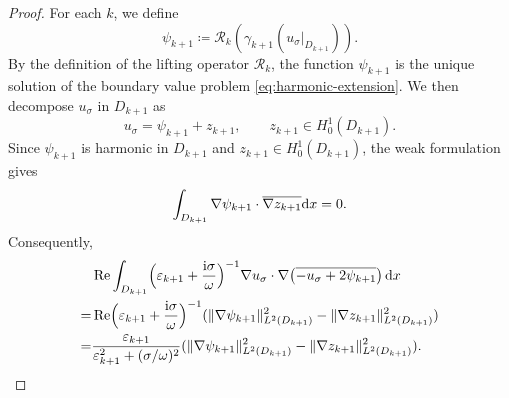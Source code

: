 \documentclass[12pt,reqno]{amsart}
\numberwithin{equation}{section}
\begin{document}
\begin{proof}
For each $k$, we define
\begin{equation*}
    \psi_{k+1} \coloneqq \mathcal{R}_k(\gamma_{k+1}(u_\sigma|_{D_{k+1}})).
\end{equation*}
By the definition of the lifting operator \(\mathcal{R}_k\), the function
\(\psi_{k+1}\) is the unique solution of the boundary value problem
\eqref{eq:harmonic-extension}. We then decompose \(u_\sigma\) in
\(D_{k+1}\) as
\[
    u_\sigma = \psi_{k+1}+z_{k+1},
    \qquad z_{k+1}\in H^1_0(D_{k+1}).
\]
Since \(\psi_{k+1}\) is harmonic in \(D_{k+1}\) and
\(z_{k+1}\in H^1_0(D_{k+1})\), the weak formulation gives
\begin{align*}
\int_{D_{k+1}}\nabla\psi_{k+1}\cdot\overline{\nabla z_{k+1}}{\rm d}x=0.
\end{align*}
Consequently,
\begin{equation}\label{eq66}
\begin{aligned}
&\operatorname{Re} \int_{D_{k+1}} \Bigl( \varepsilon_{k+1} + \frac{{\rm i}\sigma}{\omega} \Bigr)^{-1}
    \nabla u_\sigma \cdot \nabla \bigl( \overline{-u_\sigma+2\psi_{k+1}} \bigr) \, {\rm d}x\\
=&\operatorname{Re}\Bigl( \varepsilon_{k+1} + \frac{{\rm i}\sigma}{\omega} \Bigr)^{-1}(\|\nabla\psi_{k+1}\|_{L^2(D_{k+1})}^2-\|\nabla z_{k+1}\|_{L^2(D_{k+1})}^2)\\
=&\dfrac{\varepsilon_{k+1}}{\varepsilon_{k+1}^2+(\sigma/\omega)^2}(\|\nabla\psi_{k+1}\|_{L^2(D_{k+1})}^2-\|\nabla z_{k+1}\|_{L^2(D_{k+1})}^2).
\end{aligned}
\end{equation}




\end{proof}
\end{document}
